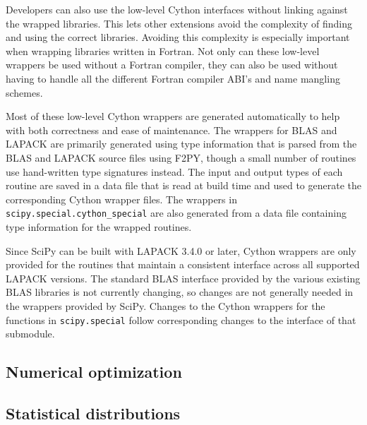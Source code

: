 \documentclass[fleqn,10pt]{wlscirep}
\begin{document}
Developers can also use the low-level Cython interfaces without linking against
the wrapped libraries\cite{blas-lapack-wrappers-scipy-2015}.  This lets other
extensions avoid the complexity of finding and using the correct libraries.
Avoiding this complexity is especially important when wrapping libraries
written in Fortran.  Not only can these low-level wrappers be used without a
Fortran compiler, they can also be used without having to handle all the
different Fortran compiler ABI's and name mangling schemes.

Most of these low-level Cython wrappers are generated automatically to help
with both correctness and ease of maintenance.  The wrappers for BLAS and
LAPACK are primarily generated using type information that is parsed from the
BLAS and LAPACK source files using F2PY\cite{peterson2009f2py}, though a small
number of routines use hand-written type signatures instead.  The input and
output types of each routine are saved in a data file that is read at build
time and used to generate the corresponding Cython wrapper files.  The wrappers
in \texttt{scipy.{\allowbreak}special.{\allowbreak}cython\_special} are also
generated from a data file containing type information for the wrapped
routines.

Since SciPy can be built with LAPACK 3.4.0 or later, Cython wrappers are only
provided for the routines that maintain a consistent interface across all
supported LAPACK versions.  The standard BLAS interface provided by the various
existing BLAS libraries is not currently changing, so changes are not generally
needed in the wrappers provided by SciPy.  Changes to the Cython wrappers for
the functions in \texttt{scipy.{\allowbreak}special} follow corresponding
changes to the interface of that submodule.

\subsection*{Numerical optimization}



\subsection*{Statistical distributions}
\end{document}
